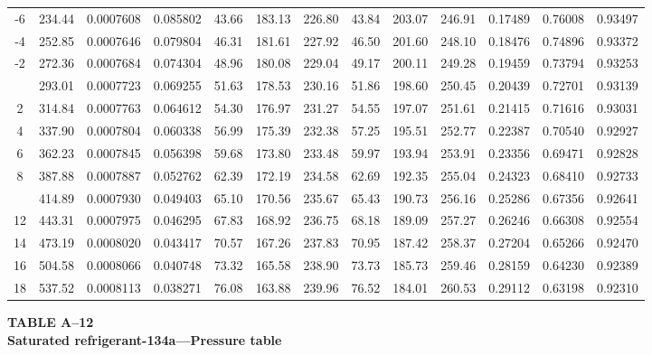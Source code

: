 \documentclass[12pt,a3paper]{article}
\begin{document}
\begin{enumerate}
\begin{center}
\begin{longtable}{c c c c c c c c c c c c c}
-6 & 234.44 & 0.0007608 & 0.085802 & 43.66 & 183.13 & 226.80 & 43.84 & 203.07 & 246.91 & 0.17489 & 0.76008 & 0.93497 \\
-4 & 252.85 & 0.0007646 & 0.079804 & 46.31 & 181.61 & 227.92 & 46.50 & 201.60 & 248.10 & 0.18476 & 0.74896 & 0.93372 \\
-2 & 272.36 & 0.0007684 & 0.074304 & 48.96 & 180.08 & 229.04 & 49.17 & 200.11 & 249.28 & 0.19459 & 0.73794 & 0.93253 \\
\addlinespace
0 & 293.01 & 0.0007723 & 0.069255 & 51.63 & 178.53 & 230.16 & 51.86 & 198.60 & 250.45 & 0.20439 & 0.72701 & 0.93139 \\
2 & 314.84 & 0.0007763 & 0.064612 & 54.30 & 176.97 & 231.27 & 54.55 & 197.07 & 251.61 & 0.21415 & 0.71616 & 0.93031 \\
4 & 337.90 & 0.0007804 & 0.060338 & 56.99 & 175.39 & 232.38 & 57.25 & 195.51 & 252.77 & 0.22387 & 0.70540 & 0.92927 \\
6 & 362.23 & 0.0007845 & 0.056398 & 59.68 & 173.80 & 233.48 & 59.97 & 193.94 & 253.91 & 0.23356 & 0.69471 & 0.92828 \\
8 & 387.88 & 0.0007887 & 0.052762 & 62.39 & 172.19 & 234.58 & 62.69 & 192.35 & 255.04 & 0.24323 & 0.68410 & 0.92733 \\
\addlinespace
10 & 414.89 & 0.0007930 & 0.049403 & 65.10 & 170.56 & 235.67 & 65.43 & 190.73 & 256.16 & 0.25286 & 0.67356 & 0.92641 \\
12 & 443.31 & 0.0007975 & 0.046295 & 67.83 & 168.92 & 236.75 & 68.18 & 189.09 & 257.27 & 0.26246 & 0.66308 & 0.92554 \\
14 & 473.19 & 0.0008020 & 0.043417 & 70.57 & 167.26 & 237.83 & 70.95 & 187.42 & 258.37 & 0.27204 & 0.65266 & 0.92470 \\
16 & 504.58 & 0.0008066 & 0.040748 & 73.32 & 165.58 & 238.90 & 73.73 & 185.73 & 259.46 & 0.28159 & 0.64230 & 0.92389 \\
18 & 537.52 & 0.0008113 & 0.038271 & 76.08 & 163.88 & 239.96 & 76.52 & 184.01 & 260.53 & 0.29112 & 0.63198 & 0.92310 \\
\end{longtable}
\end{center}

\noindent\textbf{\Large TABLE A--12} \\
\noindent\textbf{\large Saturated refrigerant-134a---Pressure table}
\vspace{0.3cm}


\end{enumerate}
\end{document}
